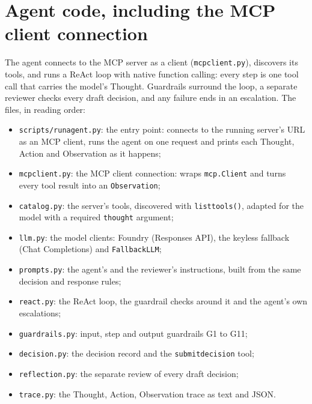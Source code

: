 \documentclass[11pt,letterpaper]{article}
\renewcommand{\_}{\textunderscore\allowbreak}
\begin{document}
\newpage
\section{Agent code, including the MCP client connection}

The agent connects to the MCP server as a client (\texttt{mcp\_client.py}), discovers its tools,
and runs a ReAct loop with native function calling: every step is one tool call that carries the
model's Thought. Guardrails surround the loop, a separate reviewer checks every draft decision,
and any failure ends in an escalation. The files, in reading order:

\begin{itemize}
  \item \texttt{scripts/run\_agent.py}: the entry point: connects to the running server's URL as an MCP client, runs the agent on one request and prints each Thought, Action and Observation as it happens;
  \item \texttt{mcp\_client.py}: the MCP client connection: wraps \texttt{mcp.Client} and turns every tool result into an \texttt{Observation};
  \item \texttt{catalog.py}: the server's tools, discovered with \texttt{list\_tools()}, adapted for the model with a required \texttt{thought} argument;
  \item \texttt{llm.py}: the model clients: Foundry (Responses API), the keyless fallback (Chat Completions) and \texttt{FallbackLLM};
  \item \texttt{prompts.py}: the agent's and the reviewer's instructions, built from the same decision and response rules;
  \item \texttt{react.py}: the ReAct loop, the guardrail checks around it and the agent's own escalations;
  \item \texttt{guardrails.py}: input, step and output guardrails G1 to G11;
  \item \texttt{decision.py}: the decision record and the \texttt{submit\_decision} tool;
  \item \texttt{reflection.py}: the separate review of every draft decision;
  \item \texttt{trace.py}: the Thought, Action, Observation trace as text and JSON.
\end{itemize}
\end{document}
